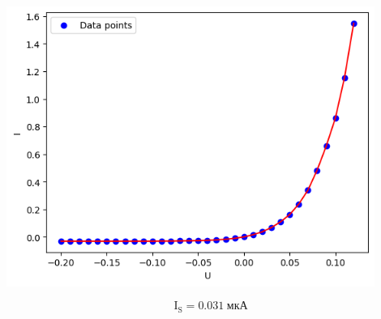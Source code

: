 \documentclass[a4paper, 14pt]{extarticle}
\begin{document}
\begin{center}
    \includegraphics[width=0.9\textwidth]{1}
\end{center}

\begin{equation*}
    \text{I}_\text{S} = 0.031 \hspace{3pt} \text{мкА}
\end{equation*}

\vfill
\end{document}
